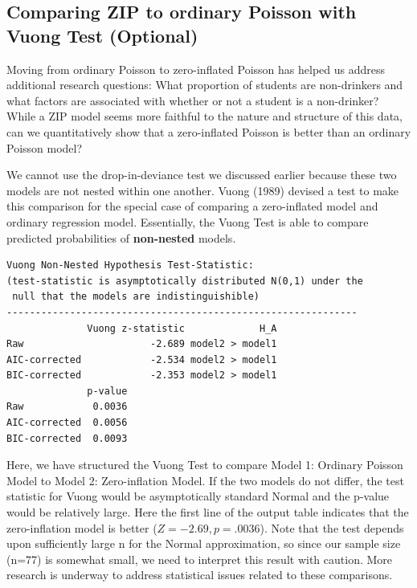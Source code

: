 \documentclass[
]{krantz}
\begin{document}
\hypertarget{comparing-zip-to-ordinary-poisson-with-vuong-test-optional}{%
\subsection{Comparing ZIP to ordinary Poisson with Vuong Test (Optional)}\label{comparing-zip-to-ordinary-poisson-with-vuong-test-optional}}

Moving from ordinary Poisson to zero-inflated Poisson has helped us address additional research questions: What proportion of students are non-drinkers and what factors are associated with whether or not a student is a non-drinker? While a ZIP model seems more faithful to the nature and structure of this data, can we quantitatively show that a zero-inflated Poisson is better than an ordinary Poisson model?

We cannot use the drop-in-deviance test we discussed earlier because these two models are not nested within one another. Vuong (1989) devised a test to make this comparison for the special case of comparing a zero-inflated model and ordinary regression model. Essentially, the Vuong Test is able to compare predicted probabilities of \textbf{non-nested} models.

\begin{verbatim}
Vuong Non-Nested Hypothesis Test-Statistic: 
(test-statistic is asymptotically distributed N(0,1) under the
 null that the models are indistinguishible)
-------------------------------------------------------------
              Vuong z-statistic             H_A
Raw                      -2.689 model2 > model1
AIC-corrected            -2.534 model2 > model1
BIC-corrected            -2.353 model2 > model1
              p-value
Raw            0.0036
AIC-corrected  0.0056
BIC-corrected  0.0093
\end{verbatim}

Here, we have structured the Vuong Test to compare Model 1: Ordinary Poisson Model to Model 2: Zero-inflation Model. If the two models do not differ, the test statistic for Vuong would be asymptotically standard Normal and the p-value would be relatively large. Here the first line of the output table indicates that the zero-inflation model is better (\(Z=-2.69,p=.0036\)). Note that the test depends upon sufficiently large n for the Normal approximation, so since our sample size (n=77) is somewhat small, we need to interpret this result with caution. More research is underway to address statistical issues related to these comparisons.
\end{document}
